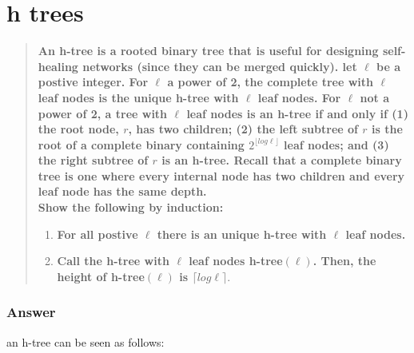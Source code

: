 \documentclass[titlepage]{article}\usepackage[]{graphicx}\usepackage[]{color}
\begin{document}
\section{h trees }
\begin{quote}
\textbf{ An h-tree is a rooted binary tree that is useful for designing self-healing
  networks (since they can be merged quickly). let $\ell$ be a postive integer.
  For $\ell$ a power of 2, the complete tree with $\ell$ leaf nodes is the
  unique h-tree with $\ell$ leaf nodes. For $\ell$ not a power of 2, a tree
  with $\ell$ leaf nodes is an h-tree if and only if (1) the root node, $r$,
  has two children; (2) the left subtree of $r$ is the root of a complete
  binary containing $2^{\lfloor log \ell \rfloor}$ leaf nodes; and (3) the
  right subtree of $r$ is an h-tree. Recall that a complete binary tree is one
  where every internal node has two children and every leaf node has the same
  depth. \\
Show the following by induction:}

  \begin{enumerate}
	\item\textbf{ For all postive $\ell$ there is an unique h-tree with $\ell $ leaf
	  nodes.}
	\item \textbf{Call the h-tree with $\ell$ leaf nodes h-tree$(\ell)$. Then, the
	  height of h-tree$(\ell)$ is $\lceil log \ell \rceil$}.
  \end{enumerate}
\end{quote}

\subsubsection{Answer}
an h-tree can be seen as follows:
\end{document}
